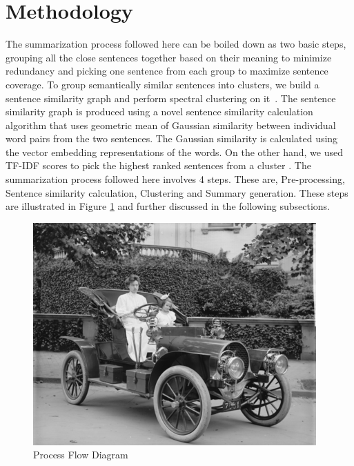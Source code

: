 \documentclass[acmlarge]{acmart}
\begin{document}
\section{Methodology}\label{sec:methodology}
The summarization process followed here can be boiled down as two basic steps, grouping all the close sentences together based on their meaning to minimize redundancy and picking one sentence from each group to maximize sentence coverage. To group semantically similar sentences into clusters, we build a sentence similarity graph and perform spectral clustering on it~\cite{roychowdhury-etal-2022-spectral-base}. The sentence similarity graph is produced using a novel sentence similarity calculation algorithm that uses geometric mean of Gaussian similarity between individual word pairs from the two sentences. The Gaussian similarity is calculated using the vector embedding representations of the words. On the other hand, we used TF-IDF scores to pick the highest ranked sentences from a cluster \cite{Akter-2017-tfidf-3, das-2022-tfidf, sarkar-2012-tfidf, sarkar-2012-tfidf-2}. The summarization process followed here involves 4 steps. These are, Pre-processing, Sentence similarity calculation, Clustering and Summary generation. These steps are illustrated in Figure \ref{fig:process-flow-diagram} and further discussed in the following subsections. 
\begin{figure}
	\centering
	
	\includegraphics{sample-franklin}
	\caption{Process Flow Diagram}
	\label{fig:process-flow-diagram}
\end{figure}
\end{document}
